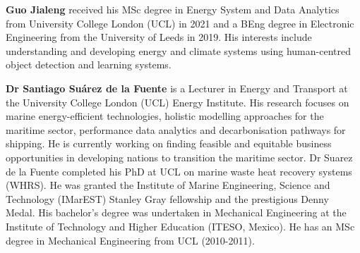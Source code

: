 \documentclass[lettersize,journal]{IEEEtran}
\begin{document}
\vspace{11pt}
\textbf{Guo Jialeng} received his MSc degree in Energy System and Data Analytics from University College London (UCL) in 2021 and a BEng degree in Electronic Engineering from the University of Leeds in 2019. His interests include understanding and developing energy and climate systems using human-centred object detection and learning systems.

\textbf{Dr Santiago Suárez de la Fuente} is a Lecturer in Energy and Transport at the University College London (UCL) Energy Institute. His research focuses on marine energy-efficient technologies, holistic modelling approaches for the maritime sector, performance data analytics and decarbonisation pathways for shipping. He is currently working on finding feasible and equitable business opportunities in developing nations to transition the maritime sector. Dr Suarez de la Fuente completed his PhD at UCL on marine waste heat recovery systems (WHRS). He was granted the Institute of Marine Engineering, Science and Technology (IMarEST) Stanley Gray fellowship and the prestigious Denny Medal. His bachelor’s degree was undertaken in Mechanical Engineering at the Institute of Technology and Higher Education (ITESO, Mexico). He has an MSc degree in Mechanical Engineering from UCL (2010-2011).







\vfill
\end{document}
